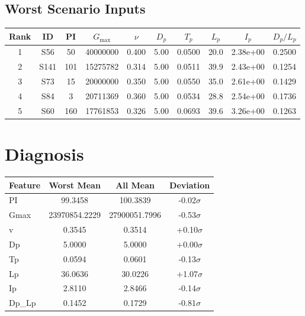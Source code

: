 \documentclass[11pt,a4paper]{article}
\begin{document}
\subsection{Worst Scenario Inputs}
\begin{table}[h]
\centering
\small
\begin{tabular}{cccccccccc}
\toprule
\textbf{Rank} & \textbf{ID} & \textbf{PI} & \textbf{$G_{\max}$} & \textbf{$\nu$} & \textbf{$D_p$} & \textbf{$T_p$} & \textbf{$L_p$} & \textbf{$I_p$} & \textbf{$D_p/L_p$} \\
\midrule
    1 & S56 & 50 & 40000000 & 0.400 & 5.00 & 0.0500 & 20.0 & 2.38e+00 & 0.2500 \\
    2 & S141 & 101 & 15275782 & 0.314 & 5.00 & 0.0511 & 39.9 & 2.43e+00 & 0.1254 \\
    3 & S73 & 15 & 20000000 & 0.350 & 5.00 & 0.0550 & 35.0 & 2.61e+00 & 0.1429 \\
    4 & S84 & 3 & 20711369 & 0.360 & 5.00 & 0.0534 & 28.8 & 2.54e+00 & 0.1736 \\
    5 & S60 & 160 & 17761853 & 0.326 & 5.00 & 0.0693 & 39.6 & 3.26e+00 & 0.1263 \\
\bottomrule
\end{tabular}
\end{table}

\section{Diagnosis}
\begin{table}[h]
\centering
\begin{tabular}{lccc}
\toprule
\textbf{Feature} & \textbf{Worst Mean} & \textbf{All Mean} & \textbf{Deviation} \\
\midrule
    PI & 99.3458 & 100.3839 & -0.02$\sigma$ \\
    Gmax & 23970854.2229 & 27900051.7996 & -0.53$\sigma$ \\
    v & 0.3545 & 0.3514 & +0.10$\sigma$ \\
    Dp & 5.0000 & 5.0000 & +0.00$\sigma$ \\
    Tp & 0.0594 & 0.0601 & -0.13$\sigma$ \\
    Lp & 36.0636 & 30.0226 & +1.07$\sigma$ \\
    Ip & 2.8110 & 2.8466 & -0.14$\sigma$ \\
    Dp_Lp & 0.1452 & 0.1729 & -0.81$\sigma$ \\
\bottomrule
\end{tabular}
\end{table}
\end{document}
